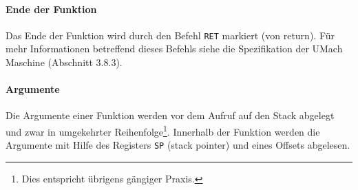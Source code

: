 \paragraph{Ende der Funktion}
Das Ende der Funktion wird durch den Befehl \texttt{RET} markiert (von
\glqq return\grqq). Für mehr Informationen betreffend dieses Befehls siehe die
Spezifikation der UMach Maschine (Abschnitt 3.8.3).


\paragraph{Argumente}

Die Argumente einer Funktion werden vor dem Aufruf auf den Stack abgelegt und
zwar in umgekehrter Reihenfolge\footnote{Dies entspricht übrigens gängiger
Praxis.}. Innerhalb der Funktion werden die Argumente mit Hilfe des Registers
\texttt{SP} (stack pointer) und eines Offsets abgelesen.

